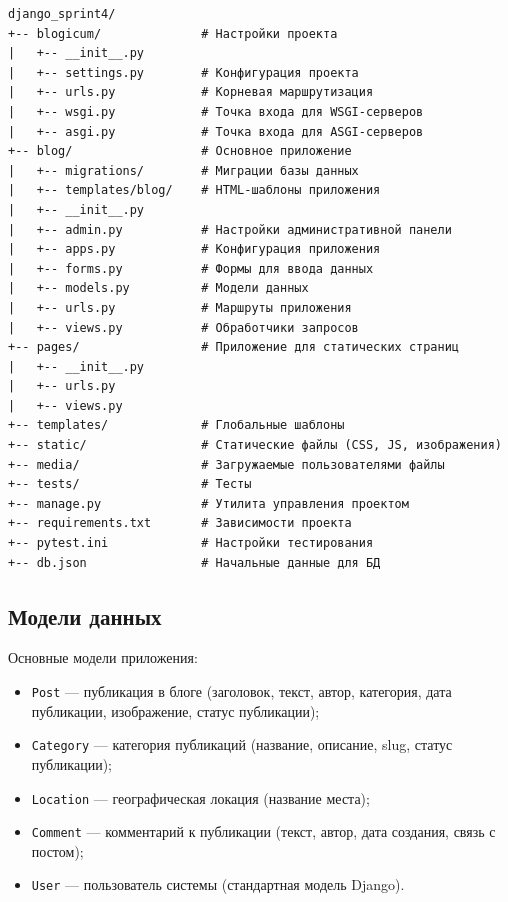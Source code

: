 \documentclass[pract,och,bachelor]{SCWorks}
\begin{document}
\begin{listing}[H]
\begin{verbatim}
django_sprint4/
+-- blogicum/              # Настройки проекта
|   +-- __init__.py
|   +-- settings.py        # Конфигурация проекта
|   +-- urls.py            # Корневая маршрутизация
|   +-- wsgi.py            # Точка входа для WSGI-серверов
|   +-- asgi.py            # Точка входа для ASGI-серверов
+-- blog/                  # Основное приложение
|   +-- migrations/        # Миграции базы данных
|   +-- templates/blog/    # HTML-шаблоны приложения
|   +-- __init__.py
|   +-- admin.py           # Настройки административной панели
|   +-- apps.py            # Конфигурация приложения
|   +-- forms.py           # Формы для ввода данных
|   +-- models.py          # Модели данных
|   +-- urls.py            # Маршруты приложения
|   +-- views.py           # Обработчики запросов
+-- pages/                 # Приложение для статических страниц
|   +-- __init__.py
|   +-- urls.py
|   +-- views.py
+-- templates/             # Глобальные шаблоны
+-- static/                # Статические файлы (CSS, JS, изображения)
+-- media/                 # Загружаемые пользователями файлы
+-- tests/                 # Тесты
+-- manage.py              # Утилита управления проектом
+-- requirements.txt       # Зависимости проекта
+-- pytest.ini             # Настройки тестирования
+-- db.json                # Начальные данные для БД
\end{verbatim}
\caption{Структура каталогов проекта}
\end{listing}

\subsection{Модели данных}

Основные модели приложения:

\begin{itemize}
    \item \texttt{Post} --- публикация в блоге (заголовок, текст, автор, категория, дата публикации, изображение, статус публикации);
    \item \texttt{Category} --- категория публикаций (название, описание, slug, статус публикации);
    \item \texttt{Location} --- географическая локация (название места);
    \item \texttt{Comment} --- комментарий к публикации (текст, автор, дата создания, связь с постом);
    \item \texttt{User} --- пользователь системы (стандартная модель Django).
\end{itemize}
\end{document}
